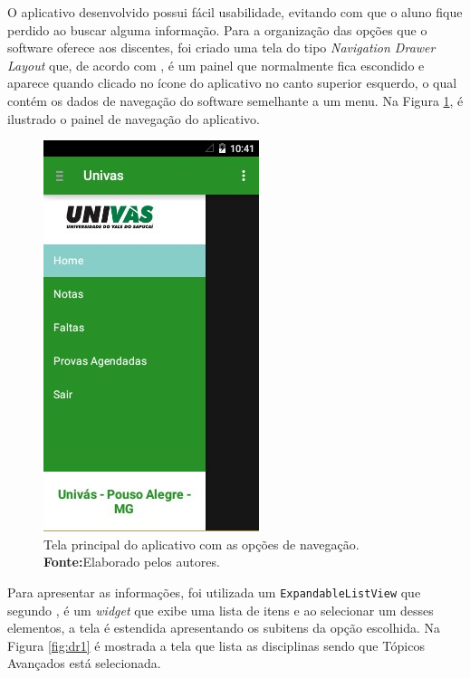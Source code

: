     \par O aplicativo desenvolvido possui fácil usabilidade, evitando com que o
aluno fique perdido ao buscar alguma informação. Para a organização das opções
que o software oferece aos discentes, foi criado uma tela do tipo
\textit{Navigation Drawer Layout} que, de acordo com ,
é um painel que normalmente fica escondido e aparece quando clicado no ícone do
aplicativo no canto superior esquerdo, o qual contém os dados de navegação do
software semelhante a um menu. Na Figura \ref{fig:dr}, é ilustrado o painel de
navegação do aplicativo.
     
\begin{figure}[h!]
    \centerline{\includegraphics[scale=0.8]{./imagens/3_discussao_resultados/dr.jpg}}
    \caption[Tela principal do aplicativo com as opções de navegação]{Tela
    principal do aplicativo com as opções de navegação.
    \textbf{Fonte:}Elaborado pelos autores.}
    \label{fig:dr}
\end{figure}

    \par Para apresentar as informações, foi utilizada um
\texttt{ExpandableListView} que segundo , é um
\textit{widget} que exibe uma lista de itens e ao selecionar um desses
elementos, a tela é estendida apresentando os subitens da opção escolhida. Na
Figura \ref{fig:dr1} é mostrada a tela que lista as disciplinas sendo que
Tópicos Avançados está selecionada.



